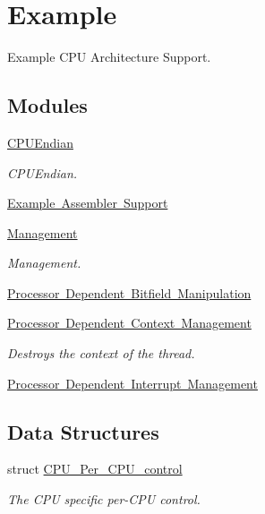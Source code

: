 \hypertarget{group__RTEMSScoreCPUExample}{}\section{Example}
\label{group__RTEMSScoreCPUExample}


Example C\+PU Architecture Support.  


\subsection*{Modules}
\begin{DoxyCompactItemize}
\item 
\mbox{\hyperlink{group__RTEMSScoreCPUExampleCPUEndian}{C\+P\+U\+Endian}}
\begin{DoxyCompactList}\small\item\em C\+P\+U\+Endian. \end{DoxyCompactList}\item 
\mbox{\hyperlink{group__RTEMSScoreCPUExampleASM}{Example Assembler Support}}
\item 
\mbox{\hyperlink{group__Management}{Management}}
\begin{DoxyCompactList}\small\item\em Management. \end{DoxyCompactList}\item 
\mbox{\hyperlink{group__RTEMSScoreCPUExampleBitfield}{Processor Dependent Bitfield Manipulation}}
\item 
\mbox{\hyperlink{group__RTEMSScoreCPUExampleContext}{Processor Dependent Context Management}}
\begin{DoxyCompactList}\small\item\em Destroys the context of the thread. \end{DoxyCompactList}\item 
\mbox{\hyperlink{group__RTEMSScoreCPUExampleInterrupt}{Processor Dependent Interrupt Management}}
\end{DoxyCompactItemize}
\subsection*{Data Structures}
\begin{DoxyCompactItemize}
\item 
struct \mbox{\hyperlink{structCPU__Per__CPU__control}{C\+P\+U\+\_\+\+Per\+\_\+\+C\+P\+U\+\_\+control}}
\begin{DoxyCompactList}\small\item\em The C\+PU specific per-\/\+C\+PU control. \end{DoxyCompactList}\end{DoxyCompactItemize}
